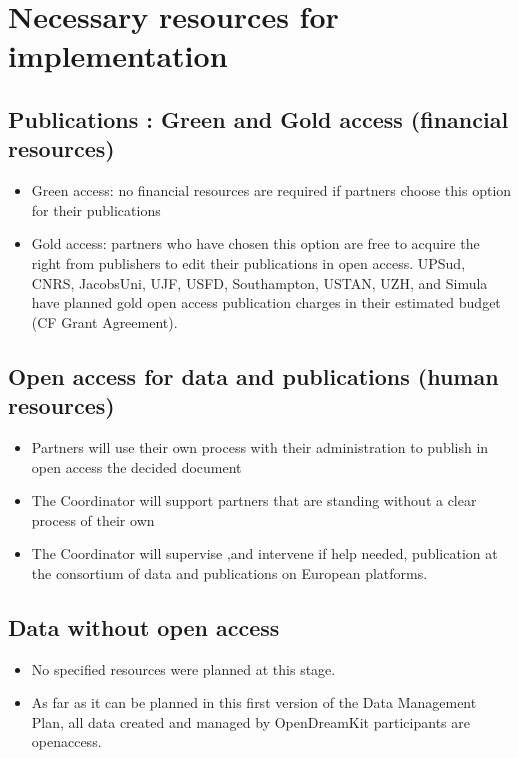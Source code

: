 \documentclass{../../Proposal/LaTeX-proposal/deliverablereport}
\begin{document}
\section{Necessary resources for implementation}
\subsection{Publications : Green and Gold access (financial resources)}


\begin{itemize}
\item{}Green access: no financial resources are required if partners choose this option for their publications
\item{}Gold access: partners who have chosen this option are free to acquire the right from publishers to edit their publications in open access.
UPSud, CNRS, JacobsUni, UJF, USFD, Southampton, USTAN, UZH, and Simula have planned gold open access publication charges in their estimated budget (CF Grant Agreement).
\end{itemize}

\subsection{Open access for data and publications (human resources)}


\begin{itemize}
\item{}Partners will use their own process with their administration to publish in open access the decided document
\item{}The Coordinator will support partners that are standing without a clear process of their own
\item{}The Coordinator will supervise ,and intervene if help needed, publication at the consortium of data and publications on European platforms.
\end{itemize}


\subsection{Data without open access}
\begin{itemize}
\item{}No specified resources were planned at this stage.
\item{}As far as it can be planned in this first version of the Data Management Plan, all data created and managed by OpenDreamKit participants are openaccess.
\end{itemize}
\newpage
\end{document}
